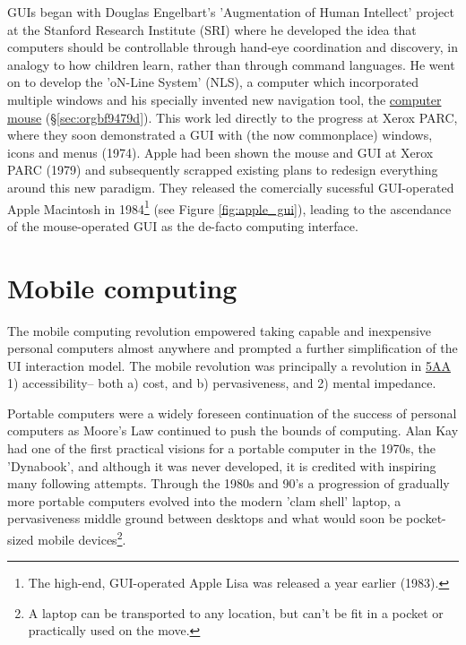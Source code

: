 \documentclass[logo,bsc,singlespacing,parskip]{infthesis}
\begin{document}
GUIs began with Douglas Engelbart's 'Augmentation of Human Intellect' project at the Stanford Research Institute (SRI) where he developed the idea that computers should be controllable through hand-eye coordination and discovery, in analogy to how children learn, rather than through command languages.
He went on to develop the 'oN-Line System' (NLS), a computer which incorporated multiple windows and his specially invented new navigation tool, the \hyperref[sec:orgbf9479d]{computer mouse} (\S \ref{sec:orgbf9479d}).
This work led directly to the progress at Xerox PARC, where they soon demonstrated a GUI with (the now commonplace) windows, icons and menus (1974).
Apple had been shown the mouse and GUI at Xerox PARC (1979) and subsequently scrapped existing plans to redesign everything around this new paradigm.
They released the comercially sucessful GUI-operated Apple Macintosh in 1984\footnote{The high-end, GUI-operated Apple Lisa was released a year earlier (1983).} (see Figure \ref{fig:apple_gui}),  leading to the ascendance of the mouse-operated GUI as the de-facto computing interface.

\section{Mobile computing}
\label{sec:orgbf001a5}
The mobile computing revolution empowered taking capable and inexpensive personal computers almost anywhere and prompted a further simplification of the UI interaction model.
The mobile revolution was principally a revolution in \hyperref[orgafbfd0c]{5AA} 1) accessibility-- both a) cost, and b) pervasiveness, and 2) mental impedance.

Portable computers were a widely foreseen continuation of the success of personal computers as Moore's Law continued to push the bounds of computing.
Alan Kay had one of the first practical visions for a portable computer in the 1970s, the 'Dynabook', and although it was never developed, it is credited with inspiring many following attempts.
Through the 1980s and 90's a progression of gradually more portable computers evolved into the modern 'clam shell' laptop, a pervasiveness middle ground between desktops and what would soon be pocket-sized mobile devices\footnote{A laptop can be transported to any location, but can't be fit in a pocket or practically used on the move.}.
\end{document}
